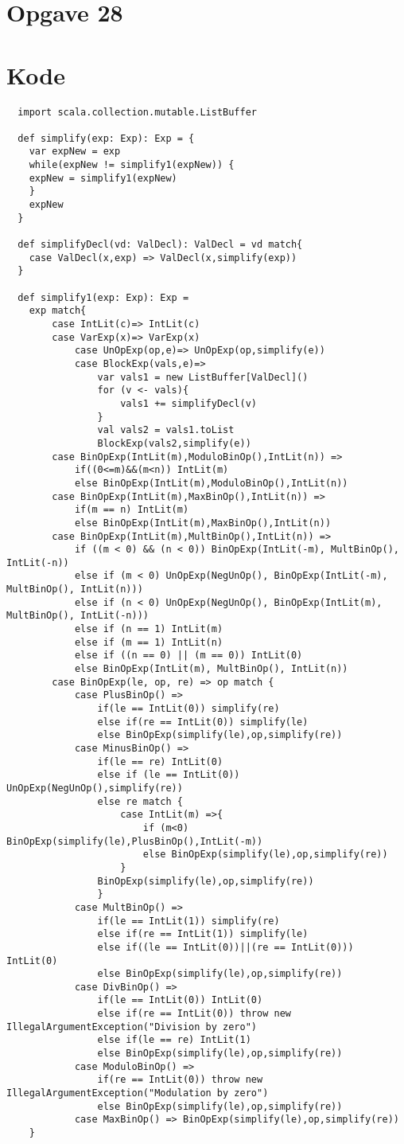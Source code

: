 \documentclass[a1paper, 10pt]{article}
\theoremstyle{remark}
\begin{document}
\section*{Opgave 28}
\section*{Kode}
\begin{lstlisting}
  import scala.collection.mutable.ListBuffer
  
  def simplify(exp: Exp): Exp = {
  	var expNew = exp
	while(expNew != simplify1(expNew)) {
  	expNew = simplify1(expNew)
  	}
  	expNew
  }
  
  def simplifyDecl(vd: ValDecl): ValDecl = vd match{
  	case ValDecl(x,exp) => ValDecl(x,simplify(exp))
  }
  
  def simplify1(exp: Exp): Exp =
  	exp match{
  		case IntLit(c)=> IntLit(c)
  		case VarExp(x)=> VarExp(x)
			case UnOpExp(op,e)=> UnOpExp(op,simplify(e))
			case BlockExp(vals,e)=>
				var vals1 = new ListBuffer[ValDecl]()
  				for (v <- vals){
  					vals1 += simplifyDecl(v)
  				}
  				val vals2 = vals1.toList
  				BlockExp(vals2,simplify(e))
	  	case BinOpExp(IntLit(m),ModuloBinOp(),IntLit(n)) =>
	  		if((0<=m)&&(m<n)) IntLit(m)
	  		else BinOpExp(IntLit(m),ModuloBinOp(),IntLit(n))
	  	case BinOpExp(IntLit(m),MaxBinOp(),IntLit(n)) =>
	  		if(m == n) IntLit(m)
	  		else BinOpExp(IntLit(m),MaxBinOp(),IntLit(n))
	  	case BinOpExp(IntLit(m),MultBinOp(),IntLit(n)) =>
	  		if ((m < 0) && (n < 0)) BinOpExp(IntLit(-m), MultBinOp(), IntLit(-n))
	  		else if (m < 0) UnOpExp(NegUnOp(), BinOpExp(IntLit(-m), MultBinOp(), IntLit(n)))
	  		else if (n < 0) UnOpExp(NegUnOp(), BinOpExp(IntLit(m), MultBinOp(), IntLit(-n)))
	  		else if (n == 1) IntLit(m)
	  		else if (m == 1) IntLit(n)
	  		else if ((n == 0) || (m == 0)) IntLit(0)
	  		else BinOpExp(IntLit(m), MultBinOp(), IntLit(n))
	  	case BinOpExp(le, op, re) => op match {
	  		case PlusBinOp() =>
	  			if(le == IntLit(0)) simplify(re)
				else if(re == IntLit(0)) simplify(le)
	  			else BinOpExp(simplify(le),op,simplify(re))
	  		case MinusBinOp() =>
	  			if(le == re) IntLit(0)
				else if (le == IntLit(0)) UnOpExp(NegUnOp(),simplify(re))
  				else re match {
	  				case IntLit(m) =>{
	  					if (m<0) BinOpExp(simplify(le),PlusBinOp(),IntLit(-m))
	  					else BinOpExp(simplify(le),op,simplify(re))
					}
	  			BinOpExp(simplify(le),op,simplify(re))
	  			}
			case MultBinOp() =>
	  			if(le == IntLit(1)) simplify(re)
  				else if(re == IntLit(1)) simplify(le)
  				else if((le == IntLit(0))||(re == IntLit(0))) IntLit(0)
				else BinOpExp(simplify(le),op,simplify(re))
	  		case DivBinOp() =>
  				if(le == IntLit(0)) IntLit(0)
  				else if(re == IntLit(0)) throw new IllegalArgumentException("Division by zero")
				else if(le == re) IntLit(1)
	  			else BinOpExp(simplify(le),op,simplify(re))
  			case ModuloBinOp() =>
  				if(re == IntLit(0)) throw new IllegalArgumentException("Modulation by zero")
  				else BinOpExp(simplify(le),op,simplify(re))
			case MaxBinOp() => BinOpExp(simplify(le),op,simplify(re))
  	}	
\end{lstlisting}
\end{document}
